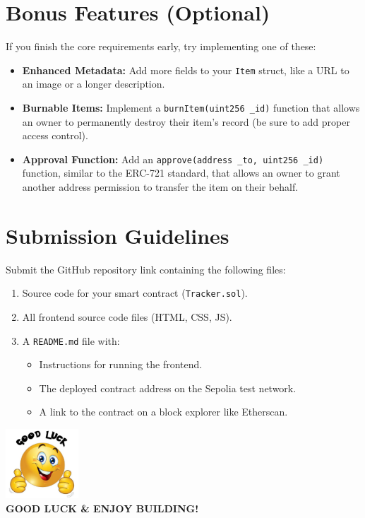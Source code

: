 \documentclass[12pt]{extarticle}
\newcommand{\allthebest}{\includegraphics[height=7em]{all_the_best.png}}
\begin{document}
\section*{Bonus Features (Optional)}
If you finish the core requirements early, try implementing one of these:
\begin{itemize}
    \item \textbf{Enhanced Metadata:} Add more fields to your \texttt{Item} struct, like a URL to an image or a longer description.
    \item \textbf{Burnable Items:} Implement a \texttt{burnItem(uint256 \_id)} function that allows an owner to permanently destroy their item's record (be sure to add proper access control).
    \item \textbf{Approval Function:} Add an \texttt{approve(address \_to, uint256 \_id)} function, similar to the ERC-721 standard, that allows an owner to grant another address permission to transfer the item on their behalf.
\end{itemize}

\section*{Submission Guidelines}
Submit the GitHub repository link containing the following files:
\begin{enumerate}
    \item Source code for your smart contract (\texttt{Tracker.sol}).
    \item All frontend source code files (HTML, CSS, JS).
    \item A \texttt{README.md} file with:
          \begin{itemize}
              \item Instructions for running the frontend.
              \item The deployed contract address on the Sepolia test network.
              \item A link to the contract on a block explorer like Etherscan.
          \end{itemize}
\end{enumerate}

\vspace{2cm}

\begin{center}
    \allthebest\\
    \Large \textbf{GOOD LUCK \& ENJOY BUILDING!}
\end{center}
\end{document}
